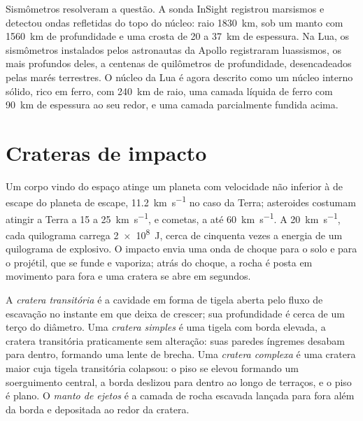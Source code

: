 Sismômetros resolveram a questão. A sonda InSight registrou
marsismos e detectou ondas refletidas do topo do núcleo: raio
\qty{1830}{km}, sob um manto com \qty{1560}{km} de profundidade e uma crosta de 20 a
\qty{37}{km} de espessura. Na Lua, os sismômetros instalados pelos astronautas da Apollo
registraram luassismos, os mais profundos deles, a centenas de
quilômetros de profundidade, desencadeados pelas marés terrestres. O núcleo da Lua é agora
descrito como um núcleo interno sólido, rico em ferro, com \qty{240}{km} de raio, uma
camada líquida de ferro com \qty{90}{km} de espessura ao seu redor, e uma
camada parcialmente fundida acima.

\section{Crateras de impacto}\label{sec:b3:planetary-interiors-surfaces:impacts}

Um corpo vindo do espaço atinge um planeta com velocidade não inferior à de escape do planeta
de escape, \qty{11.2}{km.s^{-1}} no caso da Terra; asteroides costumam atingir a Terra
a 15 a \qty{25}{km.s^{-1}}, e cometas, a até
\qty{60}{km.s^{-1}}. A \qty{20}{km.s^{-1}}, cada quilograma carrega
\qty{2e8}{J}, cerca de cinquenta vezes a energia de um quilograma de explosivo. O
impacto envia uma onda de choque para o solo e para o projétil, que
se funde e vaporiza; atrás do choque, a rocha é posta em movimento para fora e
uma cratera se abre em segundos.

\begin{definition}\label{def:b3:planetary-interiors-surfaces:crater-morphology}
A \emph{cratera transitória} é a cavidade em forma de tigela
aberta pelo fluxo de escavação no instante em que deixa de crescer; sua
profundidade é cerca de um terço do diâmetro. Uma \emph{cratera
simples} é uma tigela com borda elevada, a cratera transitória
praticamente sem alteração: suas paredes íngremes desabam para dentro, formando uma lente de
brecha. Uma \emph{cratera complexa} é uma cratera maior
cuja tigela transitória colapsou: o piso se elevou formando um soerguimento central, a
borda deslizou para dentro ao longo de terraços, e o piso é plano. O \emph{manto de
ejetos} é a camada de rocha escavada lançada para fora
além da borda e depositada ao redor da cratera.
\end{definition}

